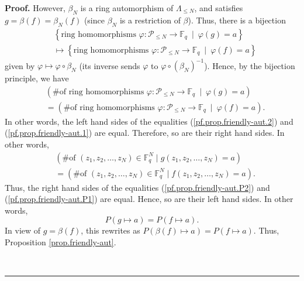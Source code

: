 \documentclass[numbers=enddot,12pt,final,onecolumn,notitlepage]{scrartcl}%
\theoremstyle{definition}
\newenvironment{proof}[1][Proof]{\noindent\textbf{#1.} }{\ \rule{0.5em}{0.5em}}
\renewcommand{\leq}{\leqslant}
\theoremstyle{plainsl}
\begin{document}
\begin{proof}
However, $\beta_{N}$ is a ring automorphism of $\Lambda_{\leq N}$, and
satisfies $g=\beta\left(  f\right)  =\beta_{N}\left(  f\right)  $ (since
$\beta_{N}$ is a restriction of $\beta$). Thus, there is a bijection%
\begin{align*}
& \left\{  \text{ring homomorphisms }\varphi:\mathcal{P}_{\leq N}%
\rightarrow\mathbb{F}_{q}\ \mid\ \varphi\left(  g\right)  =a\right\}  \\
& \mapsto\left\{  \text{ring homomorphisms }\varphi:\mathcal{P}_{\leq
N}\rightarrow\mathbb{F}_{q}\ \mid\ \varphi\left(  f\right)  =a\right\}
\end{align*}
given by $\varphi\mapsto\varphi\circ\beta_{N}$ (its inverse sends $\varphi$ to
$\varphi\circ\left(  \beta_{N}\right)  ^{-1}$). Hence, by the bijection
principle, we have%
\begin{align*}
& \left(  \text{\# of ring homomorphisms }\varphi:\mathcal{P}_{\leq
N}\rightarrow\mathbb{F}_{q}\ \mid\ \varphi\left(  g\right)  =a\right)  \\
& =\left(  \text{\# of ring homomorphisms }\varphi:\mathcal{P}_{\leq
N}\rightarrow\mathbb{F}_{q}\ \mid\ \varphi\left(  f\right)  =a\right)  .
\end{align*}
In other words, the left hand sides of the equalities
(\ref{pf.prop.friendly-aut.2}) and (\ref{pf.prop.friendly-aut.1}) are equal.
Therefore, so are their right hand sides. In other words,%
\begin{align*}
& \left(  \text{\# of }\left(  z_{1},z_{2},\ldots,z_{N}\right)  \in
\mathbb{F}_{q}^{N}\mid g\left(  z_{1},z_{2},\ldots,z_{N}\right)  =a\right)
\\
& =\left(  \text{\# of }\left(  z_{1},z_{2},\ldots,z_{N}\right)  \in
\mathbb{F}_{q}^{N}\mid f\left(  z_{1},z_{2},\ldots,z_{N}\right)  =a\right)  .
\end{align*}
Thus, the right hand sides of the equalities (\ref{pf.prop.friendly-aut.P2})
and (\ref{pf.prop.friendly-aut.P1}) are equal. Hence, so are their left hand
sides. In other words,%
\[
P\left(  g\mapsto a\right)  =P\left(  f\mapsto a\right)  .
\]
In view of $g=\beta\left(  f\right)  $, this rewrites as $P\left(
\beta\left(  f\right)  \mapsto a\right)  =P\left(  f\mapsto a\right)  $. Thus,
Proposition \ref{prop.friendly-aut}.


\end{proof}
\end{document}
